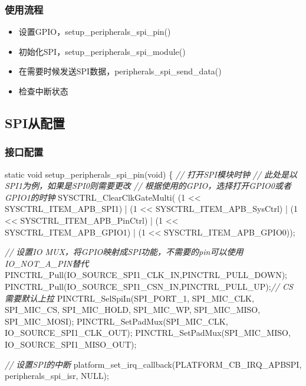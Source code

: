 \documentclass[
  12pt,
]{book}
\newenvironment{Shaded}{\begin{snugshade}}{\end{snugshade}}
\newcommand{\CommentTok}[1]{\textcolor[rgb]{0.56,0.35,0.01}{\textit{#1}}}
\newcommand{\DataTypeTok}[1]{\textcolor[rgb]{0.13,0.29,0.53}{#1}}
\newcommand{\DecValTok}[1]{\textcolor[rgb]{0.00,0.00,0.81}{#1}}
\newcommand{\NormalTok}[1]{#1}
\providecommand{\tightlist}{%
  \setlength{\itemsep}{0pt}\setlength{\parskip}{0pt}}
\begin{document}
\hypertarget{ux4f7fux7528ux6d41ux7a0b-14}{%
\subsubsection{使用流程}\label{ux4f7fux7528ux6d41ux7a0b-14}}

\begin{itemize}
\tightlist
\item
  设置GPIO，setup\_peripherals\_spi\_pin()
\item
  初始化SPI，setup\_peripherals\_spi\_module()
\item
  在需要时候发送SPI数据，peripherals\_spi\_send\_data()
\item
  检查中断状态
\end{itemize}

\hypertarget{spiux4eceux914dux7f6e-2}{%
\subsection{SPI从配置}\label{spiux4eceux914dux7f6e-2}}

\hypertarget{ux63a5ux53e3ux914dux7f6e-5}{%
\subsubsection{接口配置}\label{ux63a5ux53e3ux914dux7f6e-5}}

\begin{Shaded}
\begin{Highlighting}[]
\DataTypeTok{static} \DataTypeTok{void}\NormalTok{ setup_peripherals_spi_pin(}\DataTypeTok{void}\NormalTok{)}
\NormalTok{\{}
    \CommentTok{// 打开SPI模块时钟}
    \CommentTok{// 此处是以SPI1为例，如果是SPI0则需要更改}
    \CommentTok{// 根据使用的GPIO，选择打开GPIO0或者GPIO1的时钟}
\NormalTok{    SYSCTRL_ClearClkGateMulti(    (}\DecValTok{1}\NormalTok{ << SYSCTRL_ITEM_APB_SPI1)}
\NormalTok{                                | (}\DecValTok{1}\NormalTok{ << SYSCTRL_ITEM_APB_SysCtrl)}
\NormalTok{                                | (}\DecValTok{1}\NormalTok{ << SYSCTRL_ITEM_APB_PinCtrl)}
\NormalTok{                                | (}\DecValTok{1}\NormalTok{ << SYSCTRL_ITEM_APB_GPIO1)}
\NormalTok{                                | (}\DecValTok{1}\NormalTok{ << SYSCTRL_ITEM_APB_GPIO0));}

    \CommentTok{// 设置IO MUX，将GPIO映射成SPI功能，不需要的pin可以使用IO_NOT_A_PIN替代}
\NormalTok{    PINCTRL_Pull(IO_SOURCE_SPI1_CLK_IN,PINCTRL_PULL_DOWN);}
\NormalTok{    PINCTRL_Pull(IO_SOURCE_SPI1_CSN_IN,PINCTRL_PULL_UP);}\CommentTok{// CS 需要默认上拉}
\NormalTok{    PINCTRL_SelSpiIn(SPI_PORT_1, SPI_MIC_CLK, SPI_MIC_CS, SPI_MIC_HOLD, SPI_MIC_WP, SPI_MIC_MISO, SPI_MIC_MOSI);}
\NormalTok{    PINCTRL_SetPadMux(SPI_MIC_CLK, IO_SOURCE_SPI1_CLK_OUT);}
\NormalTok{    PINCTRL_SetPadMux(SPI_MIC_MISO, IO_SOURCE_SPI1_MISO_OUT);}
    
    \CommentTok{// 设置SPI的中断}
\NormalTok{    platform_set_irq_callback(PLATFORM_CB_IRQ_APBSPI, peripherals_spi_isr, NULL);}
\end{Highlighting}
\end{Shaded}
\end{document}
